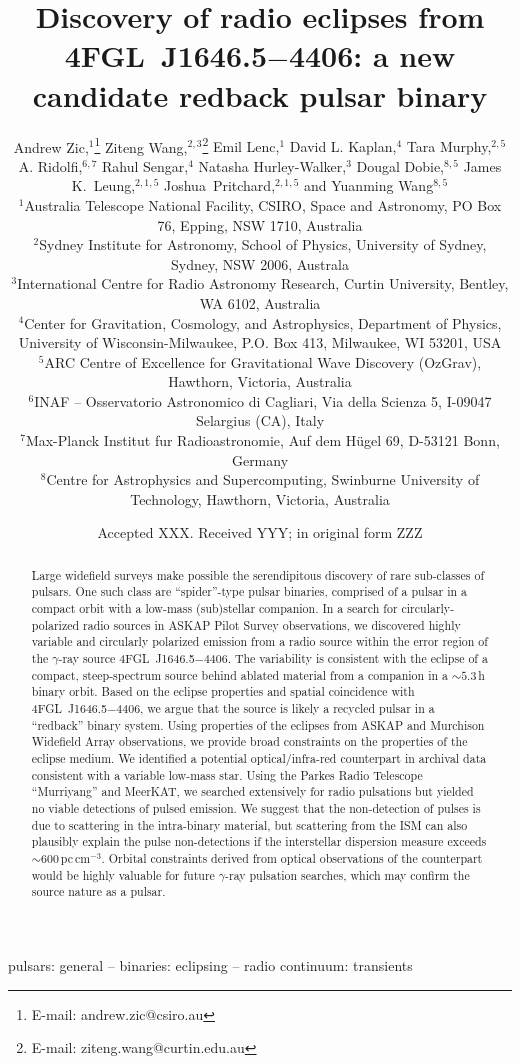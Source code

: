 \documentclass[fleqn,usenatbib]{mnras}
\title[Radio eclipses from 4FGL~J1646.5$-$4406]{Discovery of radio eclipses from {4FGL}~J1646.5$-$4406: a new candidate redback pulsar binary}
\author[A. Zic, Z. Wang et al.]{Andrew Zic,$^{1}$\thanks{E-mail: andrew.zic@csiro.au}
Ziteng Wang,$^{2,3}$\thanks{E-mail: ziteng.wang@curtin.edu.au}
{Emil Lenc,$^{1}$}
{David L. Kaplan,$^{4}$}
{Tara Murphy,$^{2,5}$} %
{A. Ridolfi,$^{6,7}$}
\newauthor
{Rahul Sengar,$^{4}$} %
{Natasha Hurley-Walker,$^{3}$}
{Dougal Dobie,$^{8,5}$}
{James K.~Leung,$^{2,1,5}$}
{Joshua~Pritchard,$^{2,1,5}$}
\newauthor
and {Yuanming Wang$^{8,5}$}
\\
$^{1}$Australia Telescope National Facility, CSIRO, Space and Astronomy, PO Box 76, Epping, NSW 1710, Australia\\
$^{2}$Sydney Institute for Astronomy, School of Physics, University of Sydney, Sydney, NSW 2006, Australa\\
$^{3}$International Centre for Radio Astronomy Research, Curtin University, Bentley, WA 6102, Australia\\
$^{4}$Center for Gravitation, Cosmology, and Astrophysics, Department of Physics, University of Wisconsin-Milwaukee, P.O. Box 413, Milwaukee, WI 53201, USA\\
$^{5}$ARC Centre of Excellence for Gravitational Wave Discovery (OzGrav), Hawthorn, Victoria, Australia\\
$^{6}$INAF – Osservatorio Astronomico di Cagliari, Via della Scienza 5, I-09047 Selargius (CA), Italy\\
$^{7}$Max-Planck Institut fur Radioastronomie, Auf dem H\"ugel 69, D-53121 Bonn, Germany\\
$^{8}$Centre for Astrophysics and Supercomputing, Swinburne University of Technology, Hawthorn, Victoria, Australia\\
}
\date{Accepted XXX. Received YYY; in original form ZZZ}
\begin{document}
\label{firstpage}
\pagerange{\pageref{firstpage}--\pageref{lastpage}}
\maketitle

\begin{abstract}
Large widefield surveys make possible the serendipitous discovery of rare sub-classes of pulsars. One such class are ``spider''-type pulsar binaries, comprised of a pulsar in a compact orbit with a low-mass (sub)stellar companion. In a search for circularly-polarized radio sources in ASKAP Pilot Survey observations, we discovered highly variable and circularly polarized emission from a radio source within the error region of the $\gamma$-ray source {4FGL}~J1646.5$-$4406. The variability is consistent with the eclipse of a compact, steep-spectrum source behind ablated material from a companion in a $\sim 5.3$\,h binary orbit. Based on the eclipse properties and spatial coincidence with {4FGL}~J1646.5$-$4406, we argue that the source is likely a recycled pulsar in a ``redback'' binary system. Using properties of the eclipses from ASKAP and Murchison Widefield Array observations, we provide broad constraints on the properties of the eclipse medium. We identified a potential optical/infra-red counterpart in archival data consistent with a variable low-mass star. Using the Parkes Radio Telescope ``Murriyang'' and MeerKAT, we searched extensively for radio pulsations but yielded no viable detections of pulsed emission. We suggest that the non-detection of pulses is due to scattering in the intra-binary material, but scattering from the ISM can also plausibly explain the pulse non-detections if the interstellar dispersion measure exceeds $\sim$600\,pc\,cm$^{-3}$. Orbital constraints derived from optical observations of the counterpart would be highly valuable for future $\gamma$-ray pulsation searches, which may confirm the source nature as a pulsar.
\end{abstract}

\begin{keywords}
pulsars: general -- binaries: eclipsing -- radio continuum: transients
\end{keywords}

\end{document}
